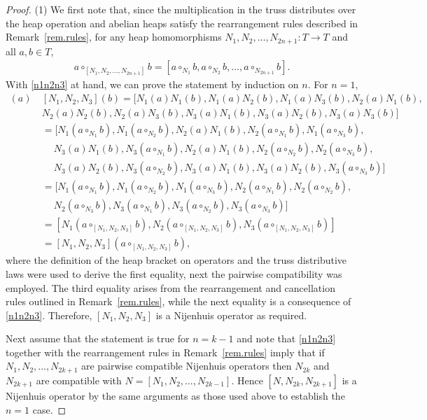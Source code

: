\documentclass[pdftex]{sigma}
\numberwithin{equation}{section}
\begin{document}
\begin{proof}
 (1) We first note that, since the multiplication in the truss distributes over the heap operation and abelian heaps satisfy the rearrangement rules described in Remark~\ref{rem.rules}, for any heap homomorphisms $N_1, N_2,\dots ,N_{2n+1}\colon T\to T$ and all $a,b\in T$,
 \begin{gather}\label{n1n2n3}
 a\circ_{[N_1,N_2,\dots, N_{2n+1}]} b = [ a\circ_{N_1} b, a\circ_{N_2} b,\dots, a\circ_{N_{2n+1}} b].
 \end{gather}
 With \eqref{n1n2n3} at hand, we can prove the statement by induction on $n$. For $n=1$,
 \begin{align*}
 [N_1,N_2,N_3](a)\ &[N_1,N_2,N_3](b) = [N_1(a)N_1(b), N_1(a)N_2(b), N_1(a)N_3(b),
 N_2(a)N_1(b), \\ & N_2(a)N_2(b),
 N_2(a)N_3(b),
 N_3(a)N_1(b), N_3(a)N_2(b), N_3(a)N_3(b)]\\
 &= [N_1(a\circ_{N_1}b), N_1(a\circ_{N_2}b),N_2(a)N_1(b), N_2(a\circ_{N_1}b),
 N_1(a\circ_{N_3}b),\\
 &\quad\ N_3(a)N_1(b), N_3(a\circ_{N_1}b), N_2(a)N_1(b), N_2(a\circ_{N_2}b), N_2(a\circ_{N_3}b),\\
 &\quad\ N_3(a)N_2(b),N_3(a\circ_{N_2}b), N_3(a)N_1(b), N_3(a)N_2(b), N_3(a\circ_{N_3}b)]\\
 &= [N_1(a\circ_{N_1}b), N_1(a\circ_{N_2}b),N_1(a\circ_{N_3}b), N_2(a\circ_{N_1}b), N_2(a\circ_{N_2}b),
 \\
 &\quad\ N_2(a\circ_{N_3}b), N_3(a\circ_{N_1}b),N_3(a\circ_{N_2}b), N_3(a\circ_{N_3}b)]\\
 &= [N_1(a\circ_{[N_1,N_2,N_3]} b), N_2(a\circ_{[N_1,N_2,N_3]} b), N_3(a\circ_{[N_1,N_2,N_3]} b)]\\
 &= [N_1,N_2,N_3](a\circ_{[N_1,N_2,N_3]} b),
 \end{align*}
 where the definition of the heap bracket on operators and the truss distributive laws were used to derive the first equality, next the pairwise compatibility was employed. The third equality arises from the rearrangement and cancellation rules outlined in Remark~\ref{rem.rules}, while the next equality is a consequence of \eqref{n1n2n3}. Therefore, $[N_1,N_2,N_3]$ is a Nijenhuis operator as required.

 Next assume that the statement is true for $n=k-1$ and note that \eqref{n1n2n3} together with the rearrangement rules in Remark~\ref{rem.rules} imply that if $N_1,N_2,\dots, N_{2k+1}$ are pairwise compatible Nijenhuis operators then $N_{2k}$ and $N_{2k+1}$ are compatible with $N=[N_1,N_2,\dots, N_{2k-1}]$. Hence $[N, N_{2k},N_{2k+1}]$ is a Nijenhuis operator by the same arguments as those used above to establish the $n=1$ case.


\end{proof}
\end{document}
